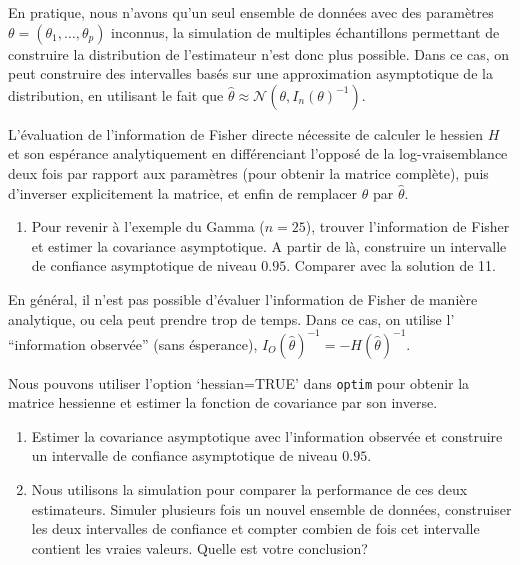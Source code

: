 \documentclass[
]{article}
\providecommand{\tightlist}{%
  \setlength{\itemsep}{0pt}\setlength{\parskip}{0pt}}
\begin{document}
En pratique, nous n'avons qu'un seul ensemble de données avec des
paramètres \(\theta=(\theta_1,\ldots,\theta_p)\) inconnus, la simulation
de multiples échantillons permettant de construire la distribution de
l'estimateur n'est donc plus possible. Dans ce cas, on peut construire
des intervalles basés sur une approximation asymptotique de la
distribution, en utilisant le fait que
\(\hat{\theta}\approx \mathcal{N}(\theta,I_n(\theta)^{-1})\).

L'évaluation de l'information de Fisher directe nécessite de calculer le
hessien \(H\) et son espérance analytiquement en différenciant l'opposé
de la log-vraisemblance deux fois par rapport aux paramètres (pour
obtenir la matrice complète), puis d'inverser explicitement la matrice,
et enfin de remplacer \(\theta\) par \(\hat{\theta}\).

\begin{enumerate}
\def\labelenumi{\arabic{enumi}.}
\setcounter{enumi}{12}
\tightlist
\item
  Pour revenir à l'exemple du Gamma (\(n=25\)), trouver l'information de
  Fisher et estimer la covariance asymptotique. A partir de là,
  construire un intervalle de confiance asymptotique de niveau \(0.95\).
  Comparer avec la solution de 11.
\end{enumerate}

En général, il n'est pas possible d'évaluer l'information de Fisher de
manière analytique, ou cela peut prendre trop de temps. Dans ce cas, on
utilise l' ``information observée'' (sans ésperance),
\(I_O(\hat{\theta})^{-1}= -H(\hat{\theta})^{-1}\).

Nous pouvons utiliser l'option `hessian=TRUE' dans \texttt{optim} pour
obtenir la matrice hessienne et estimer la fonction de covariance par
son inverse.

\begin{enumerate}
\def\labelenumi{\arabic{enumi}.}
\setcounter{enumi}{13}
\item
  Estimer la covariance asymptotique avec l'information observée et
  construire un intervalle de confiance asymptotique de niveau \(0.95\).
\item
  Nous utilisons la simulation pour comparer la performance de ces deux
  estimateurs. Simuler plusieurs fois un nouvel ensemble de données,
  construiser les deux intervalles de confiance et compter combien de
  fois cet intervalle contient les vraies valeurs. Quelle est votre
  conclusion?
\end{enumerate}
\end{document}

